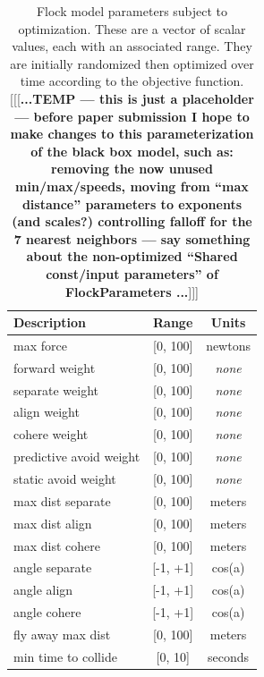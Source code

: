 \documentclass[letterpaper]{article}
\begin{document}
\begin{table}[t]
\centering
\begin{tabular}{ | l | c | c | }
    \hline
    \textbf{Description} & \textbf{Range} & \textbf{Units} \\
    \hline
    max force & [0, 100] & newtons \\
    forward weight & [0, 100] & \textit{none} \\
    separate weight & [0, 100] & \textit{none} \\
    align weight & [0, 100] & \textit{none} \\
    cohere weight & [0, 100] & \textit{none} \\
    predictive avoid weight & [0, 100] & \textit{none} \\
    static avoid weight & [0, 100] & \textit{none} \\
    max dist separate & [0, 100] & meters \\
    max dist align & [0, 100] & meters \\
    max dist cohere & [0, 100] & meters \\
    angle separate & [-1, +1] & cos(a) \\
    angle align & [-1, +1] & cos(a) \\
    angle cohere & [-1, +1] & cos(a) \\
    fly away max dist & [0, 100] & meters \\
    min time to collide & [0, 10] & seconds \\
    \hline
\end{tabular}
\caption{Flock model parameters subject to optimization. These are a vector of scalar values, each with an associated range. They are initially randomized then optimized over time according to the objective function. [[[\textbf{...TEMP --- this is just a placeholder --- before paper submission I hope to make changes to this parameterization of the black box model, such as: removing the now unused min/max/speeds, moving from ``max distance'' parameters to exponents (and scales?) controlling falloff for the 7 nearest neighbors --- say something about the non-optimized ``Shared const/input parameters'' of FlockParameters ...}]]] }
\label{table:flock-parameters}
\end{table}
\end{document}
